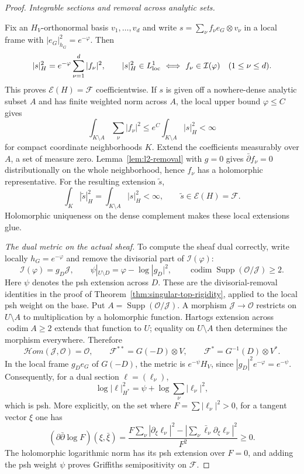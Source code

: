 \documentclass[11pt,reqno]{amsart}
\numberwithin{equation}{section}
\theoremstyle{definition}
\theoremstyle{remark}
\begin{document}
\begin{proof}
\emph{Integrable sections and removal across analytic sets.}

Fix an $H_V$-orthonormal basis $v_1,\ldots,v_d$ and write
$s=\sum_\nu f_\nu e_G\otimes v_\nu$ in a local frame with
$|e_G|_{h_G}^2=e^{-\varphi}$.  Then
\[
 |s|_H^2=e^{-\varphi}\sum_{\nu=1}^d|f_\nu|^2,
 \qquad
 |s|_H^2\in L^1_{\rm loc}
 \ \Longleftrightarrow\ f_\nu\in\mathcal I(\varphi)
       \quad(1\le\nu\le d).
\]
This proves $\mathscr E(H)=\mathcal F$ coefficientwise.
If $s$ is given off a nowhere-dense analytic subset $A$ and has finite weighted
norm across $A$, the local upper bound $\varphi\le C$ gives
\[
 \int_{K\setminus A}\sum_\nu|f_\nu|^2
 \le e^C\int_{K\setminus A}|s|_H^2<\infty
\]
for compact coordinate neighborhoods $K$.  Extend the coefficients
measurably over $A$, a set of measure zero.  Lemma~\ref{lem:l2-removal}
with $g=0$ gives $\bar\partial f_\nu=0$ distributionally on the
whole neighborhood, hence $f_\nu$ has a holomorphic representative.
For the resulting extension $\widetilde s$,
\[
 \int_K|\widetilde s|_H^2
     =\int_{K\setminus A}|s|_H^2<\infty,
 \qquad \widetilde s\in\mathscr E(H)=\mathcal F.
\]
Holomorphic uniqueness on the dense complement makes these local
extensions glue.

\emph{The dual metric on the actual sheaf.}
To compute the sheaf dual correctly, write locally $h_G=e^{-\varphi}$
and remove the divisorial part of $\mathcal I(\varphi)$:
\[
 \mathcal I(\varphi)=g_D\mathcal J,\qquad
 \psi|_{U\setminus D}=\varphi-\log|g_D|^2,\qquad
 \operatorname{codim}\operatorname{Supp}(\mathcal O/\mathcal J)\ge2.
\]
Here $\psi$ denotes the psh extension across $D$.
These are the divisorial-removal identities in the proof of
Theorem~\ref{thm:singular-top-rigidity}, applied to the local psh
weight on the base.  Put $A=\operatorname{Supp}(\mathcal O/\mathcal J)$.
A morphism $\mathcal J\to\mathcal O$ restricts on $U\setminus A$
to multiplication by a holomorphic function.  Hartogs extension
across $\operatorname{codim}A\ge2$ extends that function to $U$;
equality on $U\setminus A$ then determines the morphism everywhere.
Therefore
\[
 \mathcal Hom(\mathcal J,\mathcal O)=\mathcal O,\qquad
 \mathcal F^{**}=G(-D)\otimes V,\qquad
 \mathcal F^*=G^{-1}(D)\otimes V^*.
\]
In the local frame $g_De_G$ of $G(-D)$, the metric is
$e^{-\psi}H_V$, since $|g_D|^2e^{-\varphi}=e^{-\psi}$.
Consequently, for a dual section $\ell=(\ell_\nu)$,
\[
 \log|\ell|_{H^*}^2
 =\psi+\log\sum_\nu|\ell_\nu|^2,
\]
which is psh.  More explicitly, on the set where
$F=\sum|\ell_\nu|^2>0$, for a tangent vector $\xi$ one has
\[
 (\partial\bar\partial\log F)(\xi,\bar\xi)
 =\frac{F\sum_\nu|\partial_\xi\ell_\nu|^2
          -|\sum_\nu\bar\ell_\nu\partial_\xi\ell_\nu|^2}{F^2}
 \ge0.
\]
The holomorphic logarithmic norm has its psh extension over $F=0$,
and adding the psh weight $\psi$ proves Griffiths semipositivity
on $\mathcal F$.


\end{proof}
\end{document}
